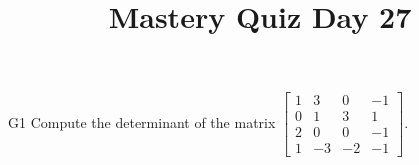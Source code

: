 \documentclass{sbgLAquiz}
\title{Mastery Quiz Day 27 }
\begin{document}
\begin{problem}{G1}
Compute the determinant of the matrix $\begin{bmatrix} 1 & 3 & 0 & -1 \\ 0 & 1 & 3 & 1 \\ 2 & 0 & 0 & -1 \\ 1 & -3 & -2 & -1 \end{bmatrix}$.
\end{problem}
\end{document}
